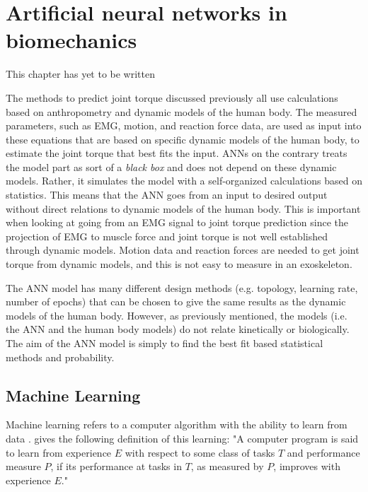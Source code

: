 \section{Artificial neural networks in biomechanics}
This chapter has yet to be written
\\
\cite{Ardestani2014,Liu2009,Lee14-1,Smith2009,Naeem2012,Kiguchi2012}

The methods to predict joint torque discussed previously all use calculations based on anthropometry and dynamic models of the human body. 
The measured parameters, such as \ac{EMG}, motion, and reaction force data, are used as input into these equations that are based on specific dynamic models of the human body, to estimate the joint torque that best fits the input.
\acp{ANN} on the contrary treats the model part as sort of a \textit{black box} and does not depend on these dynamic models. 
Rather, it simulates the model with a self-organized calculations based on statistics.
This means that the \ac{ANN} goes from an input to desired output without direct relations to dynamic models of the human body.
This is important when looking at going from an \ac{EMG} signal to joint torque prediction since the projection of \ac{EMG} to muscle force and joint torque is not well established through dynamic models.
Motion data and reaction forces are needed to get joint torque from dynamic models, and this is not easy to measure in an exoskeleton.

The \ac{ANN} model has many different design methods (e.g. topology, learning rate, number of epochs) that can be chosen to give the same results as the dynamic models of the human body. 
However, as previously mentioned, the models (i.e. the \ac{ANN} and the human body models) do not relate kinetically or biologically.
The aim of the \ac{ANN} model is simply to find the best fit based statistical methods and probability.

\subsection{Machine Learning}
Machine learning refers to a computer algorithm with the ability to learn from data \cite{Goodfellow2016}. \textcite{Mitchell1997} gives the following definition of this learning: "A computer program is said to learn from experience $E$ with respect to some class of tasks $T$ and performance measure $P$, if its performance at tasks in $T$, as measured by $P$, improves with experience $E$."

